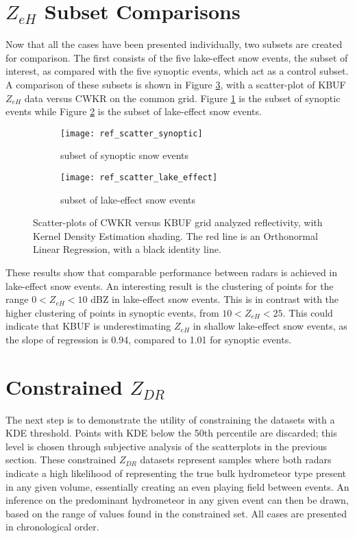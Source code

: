 \section{$Z_{eH}$ Subset Comparisons}
Now that all the cases have been presented individually, two subsets are created for comparison. The first consists of the five lake-effect snow events, the
subset of interest, as compared with the five synoptic events, which act as a control subset.
A comparison of these subsets is shown in Figure \ref{fig:ref_scatter}, with a scatter-plot of KBUF $Z_{eH}$ data versus CWKR on the common grid. Figure
\ref{fig:ref_synoptic} is the subset of synoptic events while Figure \ref{fig:ref_lake_effect} is the subset of lake-effect snow events. 
\begin{figure}[H]
\centering
   \begin{subfigure}{0.49\linewidth} \centering
     \texttt{[image: ref\_scatter\_synoptic]}
     \caption{subset of synoptic snow events}\label{fig:ref_synoptic}
   \end{subfigure}
   \begin{subfigure}{0.49\linewidth} \centering
     \texttt{[image: ref\_scatter\_lake\_effect]}
     \caption{subset of lake-effect snow events}\label{fig:ref_lake_effect}
   \end{subfigure}
\caption{Scatter-plots of CWKR versus KBUF grid analyzed reflectivity, with Kernel Density Estimation shading. The red line is an Orthonormal Linear
Regression, with a black identity line.} \label{fig:ref_scatter}
\end{figure}
These results show that
comparable performance between radars is achieved in lake-effect snow events. An interesting result is the clustering of points for the range $0 < Z_{eH} < 10$
dBZ in lake-effect snow events. This is in contrast with the higher clustering of points in synoptic events, from $10 < Z_{eH} < 25$. This could indicate that KBUF is underestimating $Z_{eH}$ in shallow lake-effect snow events, as the slope of regression is 0.94, compared to 1.01 for synoptic events.

\section{Constrained $Z_{DR}$}
The next step is to demonstrate the utility of constraining the datasets with a KDE threshold. Points with KDE below the 50th percentile are discarded; this level is chosen through subjective analysis of the scatterplots in the previous section. These constrained $Z_{DR}$ datasets represent samples where both radars indicate a
high likelihood of representing the true bulk hydrometeor type present in any given volume, essentially creating an even playing field between events. An
inference on the predominant hydrometeor in any given event can then be drawn, based on the range of values found in the constrained set. All cases are
presented in chronological order.
